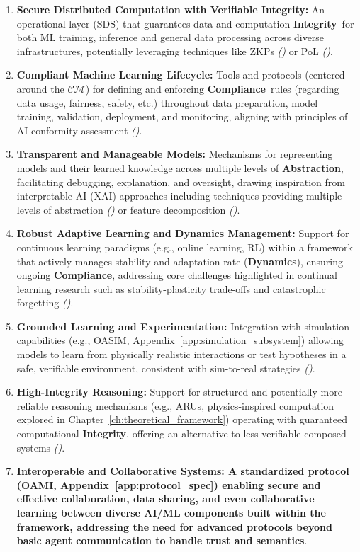 \documentclass[12pt,a4paper]{report}
\renewcommand{\citep}[1]{\textit{\scriptsize{(\cite{#1})}}}
\newcommand{\Compliance}{\textbf{Compliance}}
\newcommand{\Integrity}{\textbf{Integrity}}
\newcommand{\Abstraction}{\textbf{Abstraction}}
\newcommand{\Dynamics}{\textbf{Dynamics}}
\begin{document}
	\begin{enumerate}[leftmargin=*]
		\item \textbf{Secure Distributed Computation with Verifiable Integrity:} An operational layer (SDS) that guarantees data and computation \Integrity\ for both ML training, inference and general data processing across diverse infrastructures, potentially leveraging techniques like ZKPs \citep{Peng2025ZKMLSurvey} or PoL \citep{Jia2021ProofOfLearning}.
		\item \textbf{Compliant Machine Learning Lifecycle:} Tools and protocols (centered around the $\mathcal{CM}$) for defining and enforcing \Compliance\ rules (regarding data usage, fairness, safety, etc.) throughout data preparation, model training, validation, deployment, and monitoring, aligning with principles of AI conformity assessment \citep{Navigating_AI_Conformity_2025}.
		\item \textbf{Transparent and Manageable Models:} Mechanisms for representing models and their learned knowledge across multiple levels of \Abstraction, facilitating debugging, explanation, and oversight, drawing inspiration from interpretable AI (XAI) approaches including techniques providing multiple levels of abstraction \citep{AdditionalCitationRef22} or feature decomposition \citep{Anthropic_Decompose_2023}.
		\item \textbf{Robust Adaptive Learning and Dynamics Management:} Support for continuous learning paradigms (e.g., online learning, RL) within a framework that actively manages stability and adaptation rate (\Dynamics), ensuring ongoing \Compliance, addressing core challenges highlighted in continual learning research such as stability-plasticity trade-offs and catastrophic forgetting \citep{Wang2024ContinualLearningSurvey, AdditionalCitationRef24}.
		\item \textbf{Grounded Learning and Experimentation:} Integration with simulation capabilities (e.g., OASIM, Appendix~\ref{app:simulation_subsystem}) allowing models to learn from physically realistic interactions or test hypotheses in a safe, verifiable environment, consistent with sim-to-real strategies \citep{Josifovski_SCDA_2025, Li2025DigitalTwins}.
		\item \textbf{High-Integrity Reasoning:} Support for structured and potentially more reliable reasoning mechanisms (e.g., ARUs, physics-inspired computation explored in Chapter~\ref{ch:theoretical_framework}) operating with guaranteed computational \Integrity, offering an alternative to less verifiable composed systems \citep{Cao_PhyDRL_2024}.
		\item \textbf{Interoperable and Collaborative Systems: A standardized protocol (OAMI, Appendix~\ref{app:protocol_spec}) enabling secure and effective collaboration, data sharing, and even collaborative learning between diverse AI/ML components built within the framework, addressing the need for advanced protocols beyond basic agent communication to handle trust and semantics}.
	\end{enumerate}
	
\end{document}

